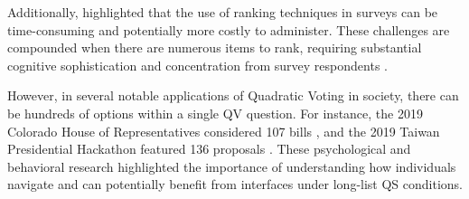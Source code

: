Additionally, \textcite{alwinMeasurementValuesSurveys1985} highlighted that the use of ranking techniques in surveys can be time-consuming and potentially more costly to administer. These challenges are compounded when there are numerous items to rank, requiring substantial cognitive sophistication and concentration from survey respondents \cite{featherMeasurementValuesEffects1973}.

However, in several notable applications of Quadratic Voting in society, there can be hundreds of options within a single QV question. For instance, the 2019 Colorado House of Representatives considered 107 bills \cite{NewWayVoting}, and the 2019 Taiwan Presidential Hackathon featured 136 proposals \cite{QuadraticVotingFrontend2022}. These psychological and behavioral research highlighted the importance of understanding how individuals navigate and can potentially benefit from interfaces under long-list QS conditions.


